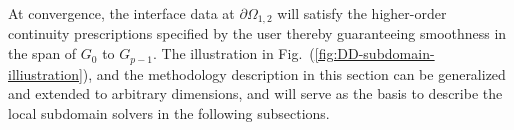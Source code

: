 \documentclass[conference]{IEEEtran}
\newcommand{\eqt}[1]{Equation~(\ref{#1})}
\newcommand{\fig}[1]{Fig.~(\ref{#1})}
\begin{document}

At convergence, the interface data at $\partial \Omega_{1,2}$ will satisfy the higher-order continuity prescriptions specified by the user thereby guaranteeing smoothness in the span of $G_0$ to $G_{p-1}$. The illustration in \fig{fig:DD-subdomain-illiustration}, and the methodology description in this section can be generalized and extended to arbitrary dimensions, and will serve as the basis to describe the local subdomain solvers in the following subsections.

%
%
%
%
\end{document}
